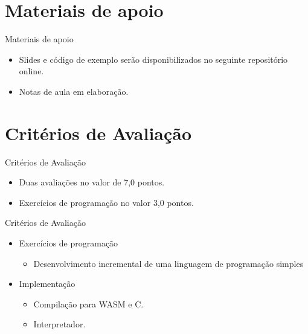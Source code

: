 \section{Materiais de apoio}\label{materiais-de-apoio}

\begin{frame}{Materiais de apoio}

    \begin{itemize}

        \item
        Slides e código de exemplo serão disponibilizados no seguinte
        repositório online.
        \item
        Notas de aula em elaboração.
    \end{itemize}
\end{frame}


\section{Critérios de Avaliação}\label{crituxe9rios-de-avaliauxe7uxe3o}

\begin{frame}{Critérios de Avaliação}

    \begin{itemize}
        \item
        Duas avaliações no valor de 7,0 pontos.
        \item
        Exercícios de programação no valor 3,0 pontos.
    \end{itemize}
\end{frame}

\begin{frame}{Critérios de Avaliação}

    \begin{itemize}

        \item
        Exercícios de programação

        \begin{itemize}

            \item
            Desenvolvimento incremental de uma linguagem de programação simples
        \end{itemize}
        \item
        Implementação

        \begin{itemize}

            \item
            Compilação para WASM e C.
            \item
            Interpretador.
        \end{itemize}
    \end{itemize}
\end{frame}

